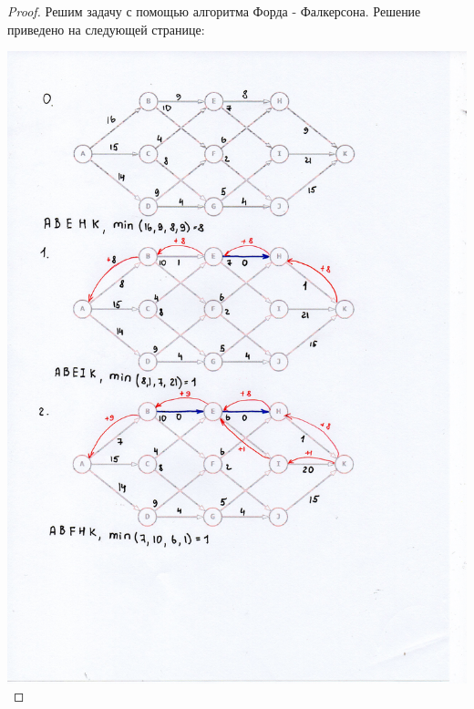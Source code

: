 \begin{proof}

    Решим задачу с помощью алгоритма Форда - Фалкерсона. Решение приведено на следующей странице:
    
    \centering\includegraphics[width=1\linewidth]{pics/14thSolution1.jpg}


\end{proof}
